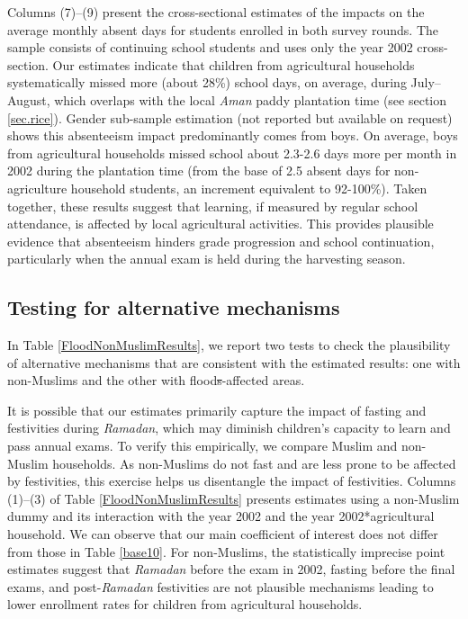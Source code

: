 \documentclass[12pt,letterpaper]{article}
\newcommand{\0}{\ensuremath{\mbox{\boldmath $0$}}}
\begin{document}
Columns (7)–(9) present the cross-sectional estimates of the impacts on the average monthly absent days for students enrolled in both survey rounds. The sample consists of continuing school students and uses only the year 2002 cross-section. Our estimates indicate that children from agricultural households systematically missed more (about 28\%) school days, on average, during July–August, which overlaps with the local \textit{Aman} paddy plantation time (see section \ref{sec.rice}). Gender sub-sample estimation (not reported but available on request) shows this absenteeism impact predominantly comes from boys. On average, boys from agricultural households missed school about 2.3-2.6 days more per month in 2002 during the plantation time (from the base of 2.5 absent days for non-agriculture household students, an increment equivalent to 92-100\%). Taken together, these results suggest that learning, if measured by regular school attendance, is affected by local agricultural activities. This provides plausible evidence that absenteeism hinders grade progression and school continuation, particularly when the annual exam is held during the harvesting season.





\subsection{Testing for alternative mechanisms}

In Table \ref{FloodNonMuslimResults}, we report two tests to check the plausibility of alternative mechanisms that are consistent with the estimated results: one with non-Muslims and the other with flood\sout{s}-affected areas. 

It is possible that our estimates primarily capture the impact of fasting and festivities during \textit{Ramadan}, which may diminish children’s capacity to learn and pass annual exams. To verify this empirically, we compare Muslim and non-Muslim households. As non-Muslims do not fast and are less prone to be affected by festivities, this exercise helps us disentangle the impact of festivities. Columns (1)–(3) of Table \ref{FloodNonMuslimResults} presents estimates using a non-Muslim dummy and its interaction with the year 2002 and the year 2002*agricultural household. We can observe that our main coefficient of interest does not differ from those in Table \ref{base10}. For non-Muslims, the statistically imprecise point estimates suggest that \textit{Ramadan} before the exam in 2002, fasting before the final exams, and post-\textit{Ramadan} festivities are not plausible mechanisms leading to lower enrollment rates for children from agricultural households.
\end{document}
